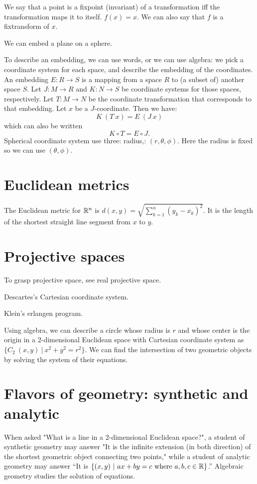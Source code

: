 We say that a point is a fixpoint (invariant)
of a transformation iff the transformation maps it to itself.
$f(x) = x$.
We can also say that $f$ is a fixtransform of $x$.

We can embed a plane on a sphere.

To describe an embedding,
we can use words, or we can use algebra:
we pick a coordinate system for each space,
and describe the embedding of the coordinates.
An embedding $E : R \to S$ is a mapping from a space $R$ to (a subset of) another space $S$.
Let $J : M \to R$ and $K : N \to S$ be coordinate systems for those spaces, respectively.
Let $T : M \to N$ be the coordinate transformation that corresponds to that embedding.
Let $x$ be a $J$-coordinate.
Then we have:
\[
K~(T~x) = E~(J~x)
\]
which can also be written
\[
K \circ T = E \circ J.
\]
Spherical coordinate system
use three: radius,: $(r,\theta,\phi)$. Here the radius is fixed so we can use $(\theta,\phi)$.

\section{Euclidean metrics}

The Euclidean metric for \(\mathbb{R}^n\) is
\(
    d(x,y) = \sqrt{\sum_{k=1}^n (y_k-x_k)^2}
\).
It is the length of the shortest straight line segment from \(x\) to \(y\).

\section{Projective spaces}

To grasp projective space, see real projective space.

Descartes's Cartesian coordinate system.

Klein's erlangen program.

Using algebra, we can describe a circle whose radius is $r$
and whose center is the origin in a 2-dimensional Euclidean space with Cartesian coordinate system
as $\{C_2~(x,y) ~|~ x^2+y^2 = r^2\}$.
We can find the intersection of two geometric objects
by solving the system of their equations.

\section{Flavors of geometry: synthetic and analytic}

When asked "What is a line in a 2-dimensional Euclidean space?",
a student of
synthetic geometry
may answer "It is the infinite extension (in both direction)
of the shortest geometric object connecting two points,"
while a student of
analytic geometry
may answer
``It is $\{ (x,y) ~|~ ax+by=c \text{ where } a,b,c\in\mathbb{R} \}$.''
Algebraic geometry studies the solution of equations.

